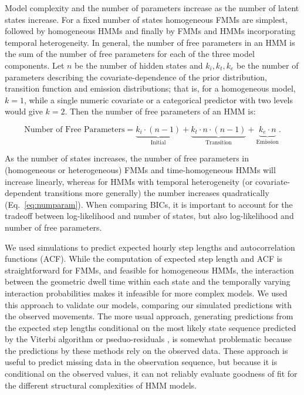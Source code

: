 \documentclass{bmcart}
\begin{document}
Model complexity and the number of parameters increase as the number of latent states increase.
For a fixed number of states homogeneous FMMs are simplest, followed by homogeneous HMMs and finally by FMMs and HMMs incorporating temporal heterogeneity. In general, the number of free parameters in an HMM is the sum of the number of free parameters for each of the three model components. Let $n$ be the number of hidden states and $k_{i}, k_{t}, k_{e}$ be the number of parameters describing the covariate-dependence of the prior distribution, transition function and emission distributions; that is, for a homogeneous model, $k=1$, while a single numeric covariate or a categorical predictor with two levels would give $k=2$. Then the number of free parameters of an HMM is:

\begin{equation}
\textrm{Number of Free Parameters}=\underbrace{k_{i}\cdot (n-1)}_{\text{Initial}} 
{+} \underbrace{k_{t}\cdot n\cdot (n-1)}_{\text{Transition}}
{+} \underbrace{ k_{e}\cdot n}_{\text{Emission}} .
\label{eq:numparam}
\end{equation}

As the number of states increases, the number of free parameters in (homogeneous or heterogeneous) FMMs and time-homogeneous HMMs will increase linearly, whereas for HMMs with temporal heterogeneity (or covariate-dependent transitions more generally) the number increases quadratically (Eq.~\ref{eq:numparam}). When comparing BICs, it is important to account for the tradeoff between log-likelihood and number of states, but also log-likelihood and number of free parameters.



We used simulations to predict expected hourly step lengths and
autocorrelation functions (ACF).  While the computation of expected
step length and ACF is straightforward for FMMs, and feasible for
homogeneous HMMs, the interaction between the geometric dwell time
within each state and the temporally varying interaction probabilities
makes it infeasible for more complex models.  We used this approach to
validate our models, comparing our simulated predictions with the
observed movements.  The more usual approach, generating predictions
from the expected step lengths conditional on the most likely state
sequence predicted by the Viterbi algorithm or pseduo-residuals \cite{zucchini_hidden_2009,langrock_flexible_2012}, is somewhat problematic
because the predictions by these methods rely on the observed data. These approach is useful to predict
missing data in the observation sequence, but because it is
conditional on the observed values, it can not reliably evaluate
goodness of fit for the different structural complexities of HMM
models.
\end{document}
